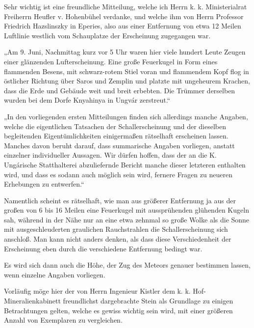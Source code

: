 \documentclass[a4paper, 11pt, oneside, german]{article}
\begin{document}
Sehr wichtig ist eine freundliche Mitteilung, welche ich Herrn k. k. Ministerialrat Freiherrn Heufler v. Hohenbühel verdanke, und welche ihm von Herrn Professor Friedrich Hazslinszky in Eperies, also aus einer Entfernung von etwa 12 Meilen Luftlinie westlich vom Schauplatze der Erscheinung zugegangen war.

„Am 9. Juni, Nachmittag kurz vor 5 Uhr waren hier viele hundert Leute Zeugen einer glänzenden Lufterscheinung. Eine große Feuerkugel in Form eines flammenden Besens, mit schwarz-rotem Stiel voran und flammendem Kopf flog in östlicher Richtung über Saros und Zemplin und platzte mit ungeheurem Krachen, dass die Erde und Gebäude weit und breit erbebten. Die Trümmer derselben wurden bei dem Dorfe Knyahinya in Ungvár zerstreut.“

„In den vorliegenden ersten Mitteilungen finden sich allerdings manche Angaben, welche die eigentlichen Tatsachen der Schallerscheinung und der dieselben begleitenden Eigentümlichkeiten einigermaßen rätselhaft erscheinen lassen. Manches davon beruht darauf, dass summarische Angaben vorliegen, anstatt einzelner individueller Aussagen. Wir dürfen hoffen, dass der an die K. Ungárische Statthalterei abzuliefernde Bericht manche dieser letzteren enthalten wird, und dass es sodann auch möglich sein wird, fernere Fragen zu neueren Erhebungen zu entwerfen.“

Namentlich scheint es rätselhaft, wie man aus größerer Entfernung ja aus der großen von 6 bis 16 Meilen eine Feuerkugel mit aussprühenden glühenden Kugeln sah, während in der Nähe nur an eine etwa zehnmal so große Wolke als die Sonne mit ausgeschleuderten graulichen Rauchstrahlen die Schallerscheinung sich anschloß. Man kann nicht anders denken, als dass diese Verschiedenheit der Erscheinung eben durch die verschiedene Entfernung bedingt war.

Es wird sich dann auch die Höhe, der Zug des Meteors genauer bestimmen lassen, wenn einzelne Angaben vorliegen.

Vorläufig möge hier der von Herrn Ingenieur Kistler dem k. k. Hof-Mineralienkabinett freundlichst dargebrachte Stein als Grundlage zu einigen Betrachtungen gelten, welche es gewiss wichtig sein wird, mit einer größeren Anzahl von Exemplaren zu vergleichen.
\end{document}
